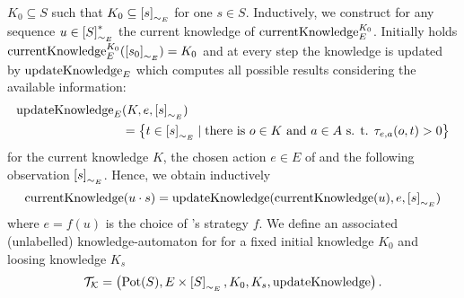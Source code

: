 $K_{0}\subseteq S$ such that $K_{0}\subseteq\left[s\right]_{\sim_{E}}$ for one 
$s\in S$. Inductively, we construct for any sequence 
$u\in \left[S\right]_{\sim_{E}}^{*}$ the current knowledge of \eve{} 
$\operatorname{currentKnowledge}^{K_{0}}_{E}$. Initially holds 
$\operatorname{currentKnowledge}^{K_{0}}_{E}(\left[s_{0}\right]_{\sim_{E}}) = K_{0}$ 
and at every step the knowledge is updated by $\operatorname{updateKnowledge}_{E}$ which computes all
possible results considering the available information: 
\begin{align*}
  \operatorname{updateKnowledge}_{E}&(K, e, \left[s\right]_{\sim_{E}})\\
  &= \left\{
    t\in\left[s\right]_{\sim_{E}}\mid \text{there is }o\in K\text{ and }a\in A
    \text{ s. t. }\tau_{e,a}(o, t) > 0
  \right\}
\end{align*}
for the current knowledge $K$, the chosen action $e\in E$ of \eve{} and the 
following observation $\left[s\right]_{\sim_{E}}$. Hence, we obtain inductively
\begin{equation*}
  \operatorname{currentKnowledge}(u\cdot s) = \operatorname{updateKnowledge}(\operatorname{currentKnowledge}(u), e, \left[s\right]_{\sim_{E}})
\end{equation*} 
where $e = f(u)$ is the choice of \eve{}'s strategy $f$. We define an 
associated (unlabelled) knowledge-automaton for \eve{} for a fixed initial 
knowledge $K_{0}$ and loosing knowledge $K_{s}$
\begin{equation*}
  \mathcal{T}_{\mathcal{K}} = \left(
    \operatorname{Pot}(S), E\times\left[S\right]_{\sim_{E}}, K_{0}, K_{s}, \operatorname{updateKnowledge}
  \right).
\end{equation*}

